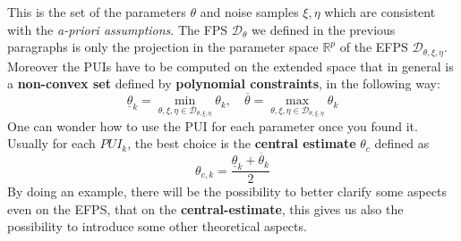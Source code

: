 This is the set of the parameters $\theta$ and noise samples $\xi, \eta$ which are consistent with the \textit{a-priori assumptions}. The FPS $\mathcal{D}_\theta$ we defined in the previous paragraphs is only the projection in the parameter space $\mathbb{R}^p$ of the EFPS $\mathcal{D}_{\theta,\xi,\eta}$.
Moreover the PUIs have to be computed on the extended space that in general is a \textbf{non-convex set} defined by \textbf{polynomial constraints}, in the following way:
{\large{
    \begin{equation}
        \underline{\theta}_k=\min_
        {\theta,\xi,\eta\in\mathcal{D_{\theta,\xi,\eta}}} {\theta_k}, \quad \overline{\theta}=\max_{\theta,\xi,\eta\in\mathcal{D_{\theta,\xi,\eta}}} {\theta_k} \label{eq:PUIs}
    \end{equation}
}}
One can wonder how to use the PUI for each parameter once you found it.  Usually for each $PUI_k$, the best choice is the \textbf{central estimate} $\theta_c$ defined as
\begin{equation*}
    \theta_{c,k} = \frac{\underline{\theta}_k+\overline{\theta}_k}{2}
\end{equation*}
By doing an example, there will be the possibility to better clarify some aspects even on the EFPS, that on the \textbf{central-estimate}, this gives us also the possibility to introduce some other theoretical aspects. 

